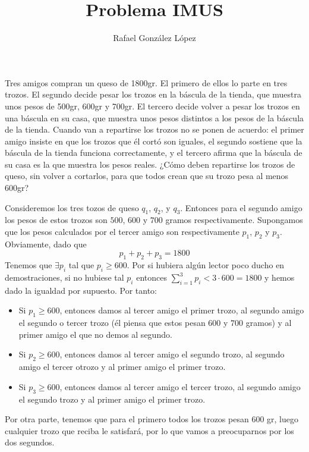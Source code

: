 \documentclass[twoside]{article}
\begin{document}
\title{Problema IMUS}
\author{Rafael González López}
\maketitle



\begin{ejer}Tres amigos compran un queso de 1800gr. El primero de ellos lo parte en tres trozos. El segundo decide pesar los trozos en la báscula de la tienda, que muestra unos pesos de 500gr, 600gr y 700gr. El tercero decide volver a pesar los trozos en una báscula en su casa, que muestra unos pesos distintos a los pesos de la báscula de la tienda. Cuando van a repartirse los trozos no se ponen de acuerdo: el primer amigo insiste en que los trozos que él cortó son iguales, el segundo sostiene que la báscula de la tienda funciona correctamente, y el tercero afirma que la báscula de su casa es la que muestra los pesos reales. ¿Cómo deben repartirse los trozos de queso, sin volver a cortarlos, para que todos crean que su trozo pesa al menos 600gr?
\end{ejer}
\begin{solucion}
Consideremos los tres tozos de queso $q_1$, $q_2$, y $q_3$. Entonces para el segundo amigo los pesos de estos trozos son $500$, $600$ y $700$ gramos respectivamente. Supongamos que los pesos calculados por el tercer amigo son respectivamente $p_1$, $p_2$ y $p_3$. Obviamente, dado que
$$
p_1+p_2+p_3 = 1800
$$
Tenemos que $\exists p_i$ tal que $p_i \geq 600$. Por si hubiera algún lector poco ducho en demostraciones, si no hubiese tal $p_i$ entonces $\sum_{i=1}^3 p_i < 3\cdot 600 = 1800$ y hemos dado la igualdad por supuesto. Por tanto:
\begin{itemize}
\item Si $p_1\geq 600$, entonces damos al tercer amigo el primer trozo, al segundo amigo el segundo o tercer trozo (él piensa que estos pesan $600$ y $700$ gramos) y al primer amigo el que no demos al segundo.
\item Si $p_2\geq 600$, entonces damos al tercer amigo el segundo trozo, al segundo amigo el tercer otrozo y al primer amigo el primer trozo.
\item Si $p_3 \geq 600$, entonces damos al tercer amigo el tercer trozo, al segundo amigo el segundo trozo y al primer amigo el primer trozo.
\end{itemize}

Por otra parte, tenemos que para el primero todos los trozos pesan $600$ gr, luego cualquier trozo que reciba le satisfará, por lo que vamos a preocuparnos por los dos segundos. 
\end{solucion}
\end{document}
